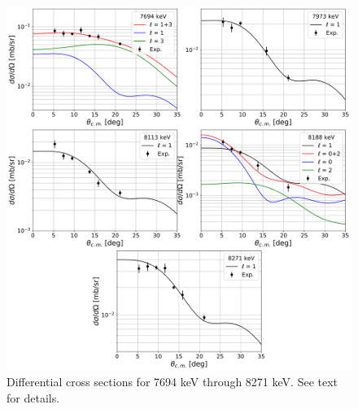 \begin{figure}[!p]
\centering
\includegraphics[width=6.5in]{Chapter-6/figs/diffcross_6panel_3.png}
\caption{\label{fig:diffcross_6panel_3}Differential cross sections for 7694 keV through 8271 keV. See text for details.}
\end{figure}

